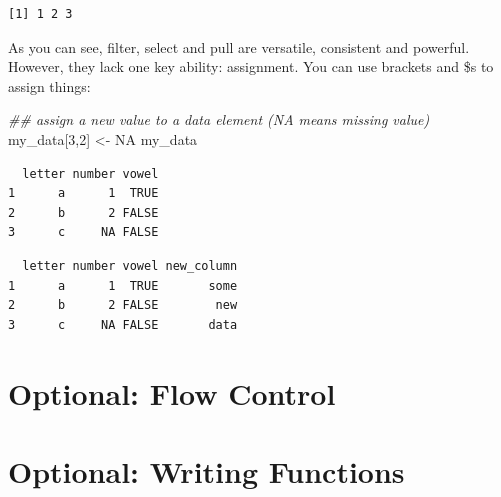 \documentclass[
  letterpaper,
  DIV=11,
  numbers=noendperiod]{scrreprt}
\newenvironment{Shaded}{\begin{snugshade}}{\end{snugshade}}
\newcommand{\ConstantTok}[1]{\textcolor[rgb]{0.56,0.35,0.01}{#1}}
\newcommand{\DecValTok}[1]{\textcolor[rgb]{0.68,0.00,0.00}{#1}}
\newcommand{\DocumentationTok}[1]{\textcolor[rgb]{0.37,0.37,0.37}{\textit{#1}}}
\newcommand{\FunctionTok}[1]{\textcolor[rgb]{0.28,0.35,0.67}{#1}}
\newcommand{\NormalTok}[1]{\textcolor[rgb]{0.00,0.23,0.31}{#1}}
\newcommand{\OtherTok}[1]{\textcolor[rgb]{0.00,0.23,0.31}{#1}}
\newcommand{\SpecialCharTok}[1]{\textcolor[rgb]{0.37,0.37,0.37}{#1}}
\newcommand{\StringTok}[1]{\textcolor[rgb]{0.13,0.47,0.30}{#1}}
\begin{document}
\begin{verbatim}
[1] 1 2 3
\end{verbatim}

As you can see, filter, select and pull are versatile, consistent and
powerful. However, they lack one key ability: assignment. You can use
brackets and \$s to assign things:

\begin{Shaded}
\begin{Highlighting}[]
\DocumentationTok{\#\# assign a new value to a data element (NA means missing value)}
\NormalTok{my\_data[}\DecValTok{3}\NormalTok{,}\DecValTok{2}\NormalTok{] }\OtherTok{\textless{}{-}} \ConstantTok{NA}
\NormalTok{my\_data}
\end{Highlighting}
\end{Shaded}

\begin{verbatim}
  letter number vowel
1      a      1  TRUE
2      b      2 FALSE
3      c     NA FALSE
\end{verbatim}

\begin{Shaded}
\end{Shaded}

\begin{verbatim}
  letter number vowel new_column
1      a      1  TRUE       some
2      b      2 FALSE        new
3      c     NA FALSE       data
\end{verbatim}

\hypertarget{optional-flow-control}{%
\section{Optional: Flow Control}\label{optional-flow-control}}

\hypertarget{optional-writing-functions}{%
\section{Optional: Writing Functions}\label{optional-writing-functions}}
\end{document}
